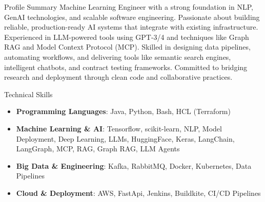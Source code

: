\documentclass{resume} %
\begin{document}

\begin{rSection}{Profile Summary}
    Machine Learning Engineer with a strong foundation in NLP, GenAI technologies, and scalable software engineering. Passionate about building reliable, production-ready AI systems that integrate with existing infrastructure. Experienced in LLM-powered tools using GPT-3/4 and techniques like Graph RAG and Model Context Protocol (MCP). Skilled in designing data pipelines, automating workflows, and delivering tools like semantic search engines, intelligent chatbots, and contract testing frameworks. Committed to bridging research and deployment through clean code and collaborative practices.
\end{rSection}

\begin{rSection}{Technical Skills}
    \begin{itemize}
        \item \textbf{Programming Languages}: Java, Python, Bash, HCL (Terraform)
        \item \textbf{Machine Learning \& AI}: Tensorflow, scikit-learn, NLP, Model Deployment, Deep Learning, LLMs, HuggingFace, Keras, LangChain, LangGraph, MCP, RAG, Graph RAG, LLM Agents
        \item \textbf{Big Data \& Engineering}: Kafka, RabbitMQ, Docker, Kubernetes, Data Pipelines
        \item \textbf{Cloud \& Deployment}: AWS, FastApi, Jenkins, Buildkite, CI/CD Pipelines
    \end{itemize}
\end{rSection}
\end{document}
